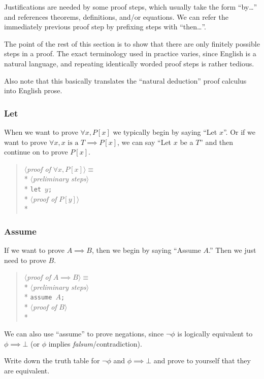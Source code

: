 Justifications are needed by some proof steps, which usually take the
form ``by\dots'' and references theorems, definitions, and/or
equations. We can refer the immediately previous proof step by prefixing
steps with ``then\dots''.

The point of the rest of this section is to show that there are only
finitely possible steps in a proof. The exact terminology used in
practice varies, since English is a natural language, and repeating
identically worded proof steps is rather tedious.

Also note that this basically translates the ``natural deduction'' proof
calculus into English prose.

\subsubsection{Let}
When we want to prove $\forall x,P[x]$ we typically begin by saying
``Let $x$''. Or if we want to prove $\forall x,x\mbox{ is a }T\implies P[x]$,
we can say ``Let $x$ be a $T$'' and then continue on to prove $P[x]$.
\begin{verse}
$\langle${\em proof of \/}$\forall x,P[x]\rangle \equiv$\\*
\qquad $\langle${\em preliminary steps\/}$\rangle$\\*
\qquad \verb|let |$y$\verb|;|\\*
\qquad $\langle${\em proof of \/}$P[y]\rangle$\\*
\end{verse}

\subsubsection{Assume}
If we want to prove $A\implies B$, then we begin by saying ``Assume $A$.''
Then we just need to prove $B$.
\begin{verse}
$\langle${\em proof of \/}$A\implies B\rangle \equiv$\\*
\qquad $\langle${\em preliminary steps\/}$\rangle$\\*
\qquad \verb|assume |$A$\verb|;|\\*
\qquad $\langle${\em proof of \/}$B\rangle$\\*
\end{verse}
We can also use ``assume'' to prove negations, since $\neg\phi$ is
logically equivalent to $\phi\implies\bot$ (or $\phi$ implies
\textit{falsum}/contradiction).

\begin{xca}
Write down the truth table for $\neg\phi$ and $\phi\implies\bot$ and
prove to yourself that they are equivalent.
\end{xca}

